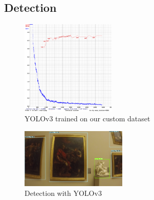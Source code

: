 \subsection{Detection}



\begin{figure}[b!]
    \centering
        \includegraphics[width=0.4\textwidth]{pictures/painting_detection/training-v3.png}
    \caption{YOLOv3 trained on our custom dataset}
    \label{fig:training-v3}
\end{figure}

\begin{figure}[h!]
    \centering
        \includegraphics[width=0.45\textwidth]{pictures/painting_detection/yolo-detection2.PNG}
    \caption{Detection with YOLOv3}
    \label{fig:yolo_detection}
\end{figure}



